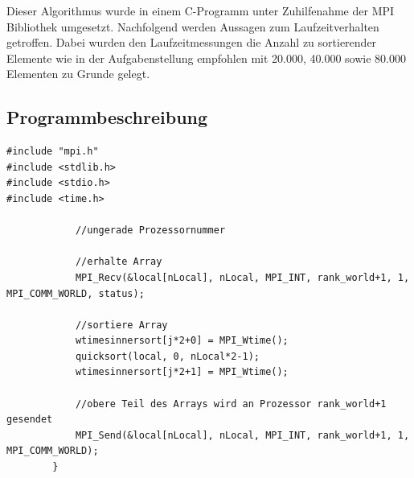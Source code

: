 \documentclass[a4paper,12pt]{scrartcl}
\begin{document}
Dieser Algorithmus wurde in einem C-Programm unter Zuhilfenahme der MPI Bibliothek umgesetzt.
Nachfolgend werden Aussagen zum Laufzeitverhalten getroffen. Dabei wurden den Laufzeitmessungen die Anzahl zu sortierender Elemente wie in der Aufgabenstellung
empfohlen mit 20.000, 40.000 sowie 80.000 Elementen zu Grunde gelegt.

\subsection{Programmbeschreibung}

\begin{lstlisting}[captionpos=b, caption=MPI C-Programm: cluster.c, label=mpiclusterc]
#include "mpi.h"
#include <stdlib.h>
#include <stdio.h>
#include <time.h>

			//ungerade Prozessornummer

			//erhalte Array
			MPI_Recv(&local[nLocal], nLocal, MPI_INT, rank_world+1, 1, MPI_COMM_WORLD, status);

			//sortiere Array
			wtimesinnersort[j*2+0] = MPI_Wtime();
			quicksort(local, 0, nLocal*2-1);
			wtimesinnersort[j*2+1] = MPI_Wtime();

			//obere Teil des Arrays wird an Prozessor rank_world+1 gesendet
			MPI_Send(&local[nLocal], nLocal, MPI_INT, rank_world+1, 1, MPI_COMM_WORLD);
		}

\end{lstlisting}
\end{document}
